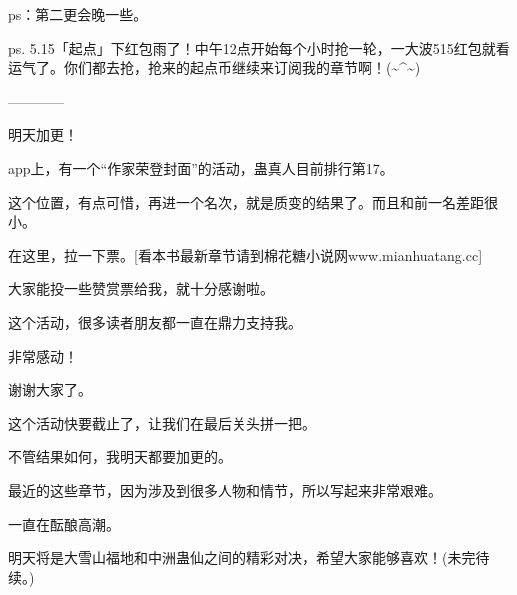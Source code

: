 \begin{this_body}
ps：第二更会晚一些。

ps. 5.15「起点」下红包雨了！中午12点开始每个小时抢一轮，一大波515红包就看运气了。你们都去抢，抢来的起点币继续来订阅我的章节啊！(\~{}\^{}\~{})

------------

明天加更！

app上，有一个“作家荣登封面”的活动，蛊真人目前排行第17。

这个位置，有点可惜，再进一个名次，就是质变的结果了。而且和前一名差距很小。

在这里，拉一下票。[看本书最新章节请到棉花糖小说网www.mianhuatang.cc]

大家能投一些赞赏票给我，就十分感谢啦。

这个活动，很多读者朋友都一直在鼎力支持我。

非常感动！

谢谢大家了。

这个活动快要截止了，让我们在最后关头拼一把。

不管结果如何，我明天都要加更的。

最近的这些章节，因为涉及到很多人物和情节，所以写起来非常艰难。

一直在酝酿高潮。

明天将是大雪山福地和中洲蛊仙之间的精彩对决，希望大家能够喜欢！(未完待续。)

\end{this_body}

